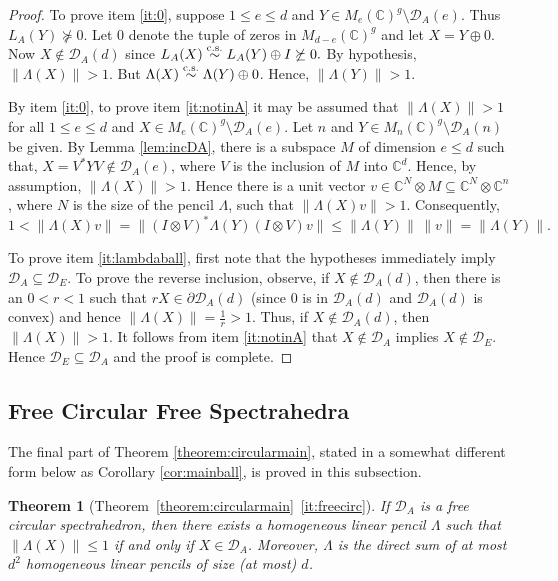 \documentclass[12pt,makeidx]{amsart}
\renewcommand{\subset}{\subseteq}
\newtheorem{theorem}{Theorem}[section]
\numberwithin{equation}{section}
\def\cD{ {{\mathcal D}}}
\def\bbF{ {\mathbb C}}
\def\C{ {\mathbb{C}} }
\def\cD{ {\mathcal D} }
\def\cs{\stackrel{\rm c.s.}{\sim}}
\begin{document}
\begin{proof}
 To prove item \ref{it:0}, suppose $1\le e\le d$ and $Y\in M_e(\C)^g\setminus  \cD_A(e)$. Thus $L_A(Y)\not\succeq 0$. Let $0$ denote the tuple of zeros in $M_{d-e}(\C)^g$ and let  $X=Y\oplus 0.$ Now $X\notin\cD_A(d)$ since $L_A(X) \cs L_A(Y)\oplus I\not\succeq 0.$  By hypothesis, $\|\Lambda(X)\|>1$. But $\Lambda(X)\cs \Lambda(Y)\oplus 0$. Hence, $\|\Lambda(Y)\|>1$.

By item \ref{it:0}, to prove item \ref{it:notinA} it may be assumed that $\|\Lambda(X)\|>1$ for all $1\le e\le d$ and $X\in M_e(\C)^g\setminus \cD_A(e)$.
 Let $n$ and $Y\in M_n(\bbF)^g \setminus \cD_A(n)$ be  given. By Lemma \ref{lem:incDA}, there is a subspace $M$ of
  dimension $e\le d$ such that, $X=V^*YV\notin \cD_A(e)$, where $V$ is  the inclusion of $M$ into $\bbF^d$.  Hence, by assumption,
 $\|\Lambda(X)\|>1$.  Hence there is a unit vector $v\in \mathbb C^N\otimes M\subset \mathbb C^N\otimes \C^n$, where $N$ is the size of the pencil $\Lambda$, such that
$\|\Lambda(X)v\|>1$.  Consequently,
\[
 1<\|\Lambda(X)v\| = \|(I\otimes V)^* \Lambda(Y)(I\otimes V)v\| \le \|\Lambda(Y)\|\, \|v\| =\|\Lambda(Y)\|.
\]

  To prove item \ref{it:lambdaball}, first note that the hypotheses 
immediately imply $\cD_A\subset \cD_E$. To prove the reverse inclusion, 
observe, if $X\notin \cD_A(d)$, then there is an $0<r< 1$ such that
$rX\in \partial \cD_A(d)$ (since $0$ is in $\cD_A(d)$ and $\cD_A(d)$
is convex) and hence $\|\Lambda(X)\|=\frac{1}{r}> 1$. Thus, if
$X\notin \cD_A(d)$, then $\|\Lambda(X)\|>1$.  It follows from item
\ref{it:notinA} that  $X\notin \cD_A$ implies
$X\notin \cD_E$. Hence $\cD_E\subset\cD_A$ and the proof is complete.
\end{proof}


\subsection{Free Circular Free Spectrahedra}
  The final part of Theorem \ref{theorem:circularmain}, stated in a somewhat different form below as Corollary \ref{cor:mainball}, is proved in this subsection.

\begin{theorem}[Theorem~\ref{theorem:circularmain}~\ref{it:freecirc}]
 \label{thm:EWball}
 If $\cD_A$ is a free circular spectrahedron, then there exists a homogeneous linear pencil $\Lambda$ such that $\|\Lambda(X)\|\le 1$ if and only if $X\in \cD_A$. Moreover, $\Lambda$ is the direct sum of at most $d^2$ homogeneous linear pencils of size (at most) $d$.
\end{theorem}
\end{document}
